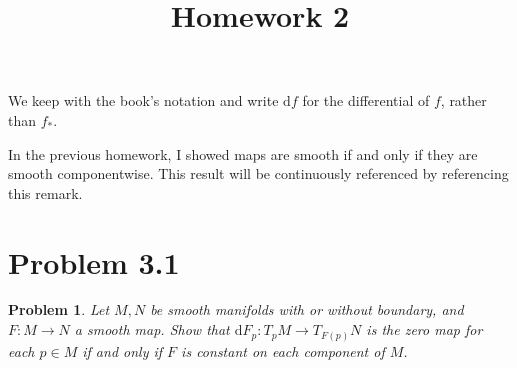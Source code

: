 \documentclass[11pt, letterpaper]{article}
\title{Homework 2}
\theoremstyle{plain}
\newtheorem{problem}{Problem}
\begin{document}
\makeproblem

\begin{convention}\label{0.1}
	We keep with the book's notation and write $\mathrm{d} f$ for the differential of $f$, rather than $f_*$.
\end{convention}
\begin{remark}\label{0.2}
	In the previous homework, I showed maps are smooth if and only if they are smooth componentwise. This result will be continuously referenced by referencing this remark.
\end{remark}


\section{Problem 3.1}

\begin{problem}
	Let $M,N$ be smooth manifolds with or without boundary, and $F : M \to N$ a smooth map. Show that $\mathrm{d} F_p : T_pM \to T_{F(p)} N$ is the zero map for each $p\in M$ if and only if $F$ is constant on each component of $M$.
\end{problem}
\end{document}
